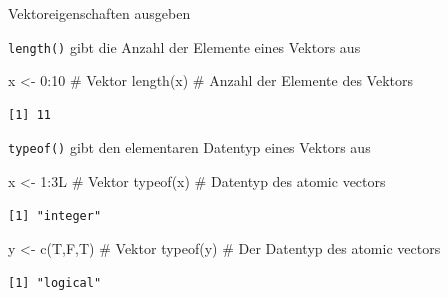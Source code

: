 \documentclass[
  8pt,
  ignorenonframetext,
]{beamer}
\newenvironment{Shaded}{\begin{snugshade}}{\end{snugshade}}
\newcommand{\CommentTok}[1]{\textcolor[rgb]{0.37,0.37,0.37}{#1}}
\newcommand{\DecValTok}[1]{\textcolor[rgb]{0.68,0.00,0.00}{#1}}
\newcommand{\FunctionTok}[1]{\textcolor[rgb]{0.28,0.35,0.67}{#1}}
\newcommand{\NormalTok}[1]{\textcolor[rgb]{0.00,0.23,0.31}{#1}}
\newcommand{\OtherTok}[1]{\textcolor[rgb]{0.00,0.23,0.31}{#1}}
\newcommand{\SpecialCharTok}[1]{\textcolor[rgb]{0.37,0.37,0.37}{#1}}
\begin{document}
\begin{frame}[fragile]{Vektoreigenschaften ausgeben}
\protect\hypertarget{vektoreigenschaften-ausgeben}{}
\small

\texttt{length()} gibt die Anzahl der Elemente eines Vektors aus \tiny

\begin{Shaded}
\begin{Highlighting}[]
\NormalTok{x }\OtherTok{\textless{}{-}} \DecValTok{0}\SpecialCharTok{:}\DecValTok{10}          \CommentTok{\# Vektor}
\FunctionTok{length}\NormalTok{(x)          }\CommentTok{\# Anzahl der Elemente des Vektors}
\end{Highlighting}
\end{Shaded}

\begin{verbatim}
[1] 11
\end{verbatim}

\vspace{2mm}
\small

\texttt{typeof()} gibt den elementaren Datentyp eines Vektors aus

\tiny

\begin{Shaded}
\begin{Highlighting}[]
\NormalTok{x }\OtherTok{\textless{}{-}} \DecValTok{1}\SpecialCharTok{:}\NormalTok{3L          }\CommentTok{\# Vektor}
\FunctionTok{typeof}\NormalTok{(x)          }\CommentTok{\# Datentyp des atomic vectors}
\end{Highlighting}
\end{Shaded}

\begin{verbatim}
[1] "integer"
\end{verbatim}

\vspace{2mm}

\begin{Shaded}
\begin{Highlighting}[]
\NormalTok{y }\OtherTok{\textless{}{-}} \FunctionTok{c}\NormalTok{(T,F,T)      }\CommentTok{\# Vektor}
\FunctionTok{typeof}\NormalTok{(y)          }\CommentTok{\# Der Datentyp des atomic vectors}
\end{Highlighting}
\end{Shaded}

\begin{verbatim}
[1] "logical"
\end{verbatim}

\vspace{2mm}


\end{frame}
\end{document}
